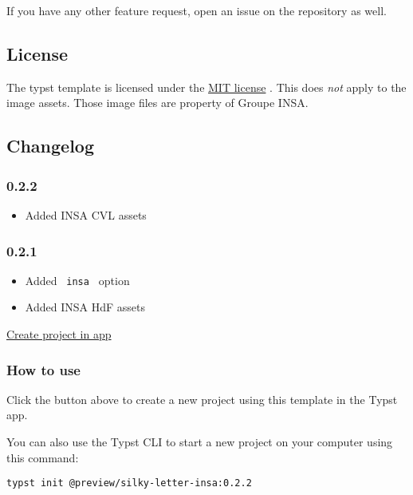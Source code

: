 If you have any other feature request, open an issue on the repository
as well.

\subsection{License}\label{license}

The typst template is licensed under the
\href{https://github.com/SkytAsul/INSA-Typst-Template/blob/main/LICENSE}{MIT
license} . This does \emph{not} apply to the image assets. Those image
files are property of Groupe INSA.

\subsection{Changelog}\label{changelog}

\subsubsection{0.2.2}\label{section}

\begin{itemize}
\tightlist
\item
  Added INSA CVL assets
\end{itemize}

\subsubsection{0.2.1}\label{section-1}

\begin{itemize}
\tightlist
\item
  Added \texttt{\ insa\ } option
\item
  Added INSA HdF assets
\end{itemize}

\href{/app?template=silky-letter-insa&version=0.2.2}{Create project in
app}

\subsubsection{How to use}\label{how-to-use}

Click the button above to create a new project using this template in
the Typst app.

You can also use the Typst CLI to start a new project on your computer
using this command:

\begin{verbatim}
typst init @preview/silky-letter-insa:0.2.2
\end{verbatim}


